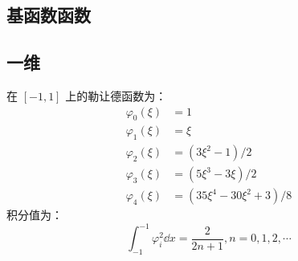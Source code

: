 \documentclass{article}
\numberwithin{equation}{subsection}    %
\begin{document}
\begin{appendix}
    \newpage
    \section{基函数函数}
    \cite{RN48}
    \subsection{一维}
    在 $[-1,1]$ 上的勒让德函数为：
    \begin{equation}
        \begin{aligned}
            \varphi_{0}(\xi) & =1                                        \\
            \varphi_{1}(\xi) & =\xi                                      \\
            \varphi_{2}(\xi) & =\left(3 \xi^{2}-1\right) / 2             \\
            \varphi_{3}(\xi) & =\left(5 \xi^{3}-3 \xi\right) / 2         \\
            \varphi_{4}(\xi) & =\left(35 \xi^{4}-30 \xi^{2}+3\right) / 8
        \end{aligned}
    \end{equation}
    积分值为：
    \begin{equation}
        \int_{-1}^{-1}\varphi_i^2\dd x=\frac{2}{2n+1},n=0,1,2,\cdots
    \end{equation}


\end{appendix}
\end{document}

